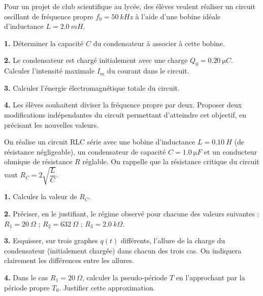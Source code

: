 \documentclass[11pt]{article}
\begin{document}
\begin{exercice}
Pour un projet de club scientifique au lycée, des élèves veulent réaliser un circuit oscillant de fréquence propre $f_0 = \SI{50}{kHz}$ à l'aide d'une bobine idéale d'inductance $L = \SI{2,0}{mH}$.

\textbf{1.} Déterminer la capacité $C$ du condensateur à associer à cette bobine.

\textbf{2.} Le condensateur est chargé initialement avec une charge $Q_0 = \SI{0,20}{\micro C}$. Calculer l'intensité maximale $I_m$ du courant dans le circuit.

\textbf{3.} Calculer l'énergie électromagnétique totale du circuit.

\textbf{4.} Les élèves souhaitent diviser la fréquence propre par deux. Proposer deux modifications indépendantes du circuit permettant d'atteindre cet objectif, en précisant les nouvelles valeurs.
\end{exercice}

\begin{exercice}
On réalise un circuit RLC série avec une bobine d'inductance $L = \SI{0,10}{H}$ (de résistance négligeable), un condensateur de capacité $C = \SI{1,0}{\micro F}$ et un conducteur ohmique de résistance $R$ réglable. On rappelle que la résistance critique du circuit vaut $R_C = 2\sqrt{\dfrac{L}{C}}$.

\textbf{1.} Calculer la valeur de $R_C$.

\textbf{2.} Préciser, en le justifiant, le régime observé pour chacune des valeurs suivantes : $R_1 = \SI{20}{\Omega}$ ; $R_2 = \SI{632}{\Omega}$ ; $R_3 = \SI{2,0}{k\Omega}$.

\textbf{3.} Esquisser, sur trois graphes $q(t)$ différents, l'allure de la charge du condensateur (initialement chargée) dans chacun des trois cas. On indiquera clairement les différences entre les allures.

\textbf{4.} Dans le cas $R_1 = \SI{20}{\Omega}$, calculer la pseudo-période $T$ en l'approchant par la période propre $T_0$. Justifier cette approximation.
\end{exercice}
\end{document}
